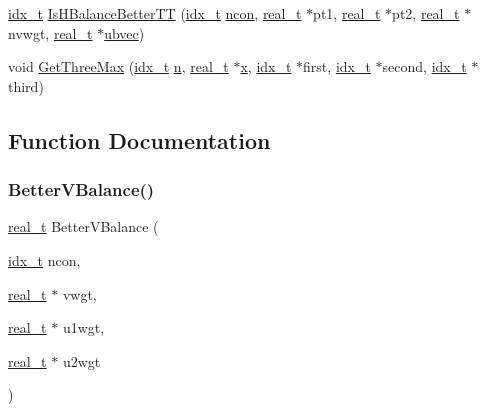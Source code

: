 \begin{DoxyCompactItemize}
\item 
\hyperlink{a00876_aaa5262be3e700770163401acb0150f52}{idx\+\_\+t} \hyperlink{a00873_adc07d03604c851e71cf29d34c6478c72}{Is\+H\+Balance\+Better\+TT} (\hyperlink{a00876_aaa5262be3e700770163401acb0150f52}{idx\+\_\+t} \hyperlink{a00879_ac1dd31740e8f97fb57dc917ded30253f}{ncon}, \hyperlink{a00876_a1924a4f6907cc3833213aba1f07fcbe9}{real\+\_\+t} $\ast$pt1, \hyperlink{a00876_a1924a4f6907cc3833213aba1f07fcbe9}{real\+\_\+t} $\ast$pt2, \hyperlink{a00876_a1924a4f6907cc3833213aba1f07fcbe9}{real\+\_\+t} $\ast$nvwgt, \hyperlink{a00876_a1924a4f6907cc3833213aba1f07fcbe9}{real\+\_\+t} $\ast$\hyperlink{a00879_af48bb348bc8440a61f90f137de83f203}{ubvec})
\item 
void \hyperlink{a00873_a893c1adfdd73d517232ee3260cb87940}{Get\+Three\+Max} (\hyperlink{a00876_aaa5262be3e700770163401acb0150f52}{idx\+\_\+t} \hyperlink{a00623_a781a04ab095280f838ff3eb0e51312e0}{n}, \hyperlink{a00876_a1924a4f6907cc3833213aba1f07fcbe9}{real\+\_\+t} $\ast$\hyperlink{a00605_ac98c3bb25378222646e977292011625f}{x}, \hyperlink{a00876_aaa5262be3e700770163401acb0150f52}{idx\+\_\+t} $\ast$first, \hyperlink{a00876_aaa5262be3e700770163401acb0150f52}{idx\+\_\+t} $\ast$second, \hyperlink{a00876_aaa5262be3e700770163401acb0150f52}{idx\+\_\+t} $\ast$third)
\end{DoxyCompactItemize}


\subsection{Function Documentation}
\mbox{\label{a00873_acdb4f29e5471390adeef43e471379a8c}} 
\subsubsection{\texorpdfstring{Better\+V\+Balance()}{BetterVBalance()}}
{\footnotesize\ttfamily \hyperlink{a00876_a1924a4f6907cc3833213aba1f07fcbe9}{real\+\_\+t} Better\+V\+Balance (\begin{DoxyParamCaption}\item[{\hyperlink{a00876_aaa5262be3e700770163401acb0150f52}{idx\+\_\+t}}]{ncon,  }\item[{\hyperlink{a00876_a1924a4f6907cc3833213aba1f07fcbe9}{real\+\_\+t} $\ast$}]{vwgt,  }\item[{\hyperlink{a00876_a1924a4f6907cc3833213aba1f07fcbe9}{real\+\_\+t} $\ast$}]{u1wgt,  }\item[{\hyperlink{a00876_a1924a4f6907cc3833213aba1f07fcbe9}{real\+\_\+t} $\ast$}]{u2wgt }\end{DoxyParamCaption})}

